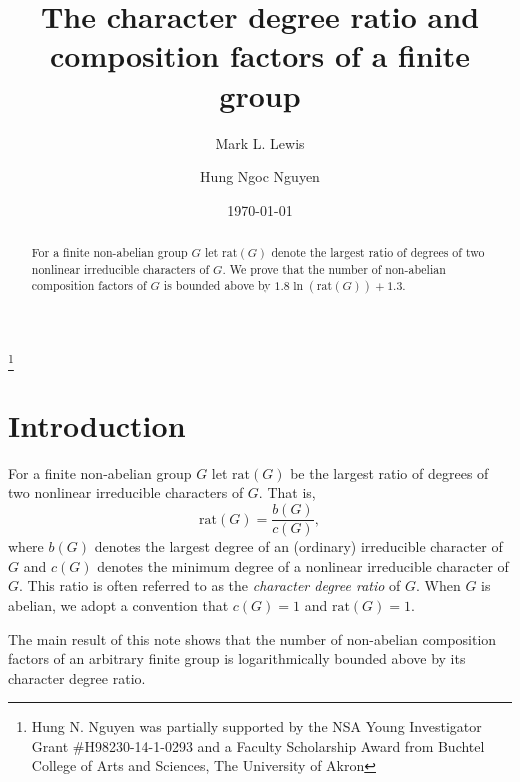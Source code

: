 \documentclass[12pt]{amsart}
\theoremstyle{definition}
\theoremstyle{remark}
\begin{document}
\title[The character degree ratio]
{The character degree ratio and composition factors of a finite
group}

\thanks{Hung N. Nguyen was partially supported by the NSA Young
  Investigator Grant \#H98230-14-1-0293 and a Faculty Scholarship
  Award from Buchtel College of Arts and Sciences, The University
  of Akron}

\author{Mark L. Lewis}
\address{Department of Mathematical Sciences, Kent State University, Kent,
OH 44242, USA} 

\author[Hung Ngoc Nguyen]{Hung Ngoc Nguyen}
\address{Department of Mathematics, The University of Akron, Akron,
Ohio 44325, USA} 



\date{\today}

\begin{abstract} For a finite non-abelian group $G$ let ${{\mathrm {rat}}}(G)$ denote the largest ratio
of degrees of two nonlinear irreducible characters of $G$. We prove
that the number of non-abelian composition factors of $G$ is bounded
above by $1.8\ln({{\mathrm {rat}}}(G))+1.3$.
\end{abstract}

\maketitle

\section{Introduction}

For a finite non-abelian group $G$ let ${{\mathrm {rat}}}(G)$ be the largest
ratio of degrees of two nonlinear irreducible characters of $G$.
That is,
\[{{\mathrm {rat}}}(G)=\frac{b(G)}{c(G)},\] where $b(G)$ denotes the largest degree of an (ordinary) irreducible
character of $G$ and $c(G)$ denotes the minimum degree of a
nonlinear irreducible character of $G$. This ratio is often referred
to as the \emph{character degree ratio} of $G$. When $G$ is abelian,
we adopt a convention that $c(G)=1$ and ${{\mathrm {rat}}}(G)=1$.

The main result of this note shows that the number of non-abelian
composition factors of an arbitrary finite group is logarithmically
bounded above by its character degree ratio.
\end{document}

